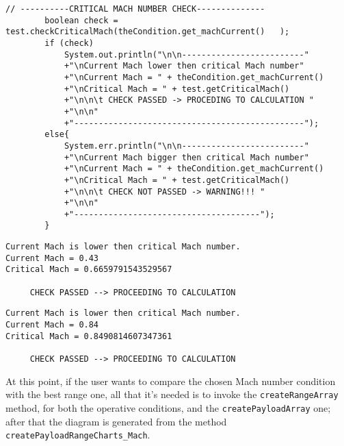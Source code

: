 \bigskip
\begin{lstlisting}[caption={Excerpt of the ATR-72 Payload-Range test - critical Mach number check}, captionpos=b, tabsize=2]
		// ----------CRITICAL MACH NUMBER CHECK--------------
		boolean check = test.checkCriticalMach(theCondition.get_machCurrent()	);
		if (check)
			System.out.println("\n\n-------------------------"
			+"\nCurrent Mach lower then critical Mach number"
			+"\nCurrent Mach = " + theCondition.get_machCurrent() 
			+"\nCritical Mach = " + test.getCriticalMach() 
			+"\n\n\t CHECK PASSED -> PROCEDING TO CALCULATION "
			+"\n\n"
			+"-----------------------------------------------");
		else{
			System.err.println("\n\n-------------------------"
			+"\nCurrent Mach bigger then critical Mach number"
			+"\nCurrent Mach = " + theCondition.get_machCurrent() 
			+"\nCritical Mach = " + test.getCriticalMach() 
			+"\n\n\t CHECK NOT PASSED -> WARNING!!! "
			+"\n\n"
			+"--------------------------------------");
		}
\end{lstlisting}

\bigskip
\begin{lstlisting}[caption={Excerpt of the ATR-72 Payload-Range test results - critical Mach number check}, captionpos=b, tabsize=2]
Current Mach is lower then critical Mach number.
Current Mach = 0.43
Critical Mach = 0.6659791543529567

	 CHECK PASSED --> PROCEEDING TO CALCULATION 
\end{lstlisting}

\bigskip
\begin{lstlisting}[caption={Excerpt of the B747-100B Payload-Range test results - critical Mach number check}, captionpos=b, tabsize=2]
Current Mach is lower then critical Mach number.
Current Mach = 0.84
Critical Mach = 0.8490814607347361

	 CHECK PASSED --> PROCEEDING TO CALCULATION 
\end{lstlisting}

\bigskip
\noindent
At this point, if the user wants to compare the chosen Mach number condition with the best range one, all that it’s needed is to invoke the \lstinline[language=Java]!createRangeArray! method, for both the operative conditions, and the \lstinline[language=Java]!createPayloadArray! one; after that the diagram is generated from the method \lstinline[language=Java]!createPayloadRangeCharts_Mach!.

